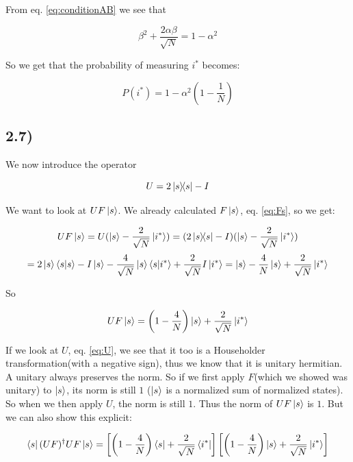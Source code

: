 \documentclass[a4paper,norsk, 10pt]{article}
\begin{document}
From eq. \eqref{eq:conditionAB} we see that

\begin{equation}
\beta^2 + \frac{2\alpha \beta}{\sqrt{N}}  = 1 - \alpha^2
\end{equation}

So we get that the probability of measuring $i^*$ becomes:

\begin{equation}
P(i^*) = 1 - \alpha^2\left(1 - \frac{1}{N}\right)
\label{eq:prob}
\end{equation}

\subsection{2.7)}

We now introduce the operator

\begin{equation}
U = 2\ketbra{s}{s} - I
\label{eq:U}
\end{equation}

We want to look at $UF\ket{s}$. We already calculated $F\ket{s}$, eq. \eqref{eq:Fs}, so we get: 

\begin{equation*}
UF\ket{s} = U(\ket{s} - \frac{2}{\sqrt{N}}\ket{i^*}) = (2\ketbra{s}{s} - I)(\ket{s} - \frac{2}{\sqrt{N}}\ket{i^*})
\end{equation*}
\begin{equation}
= 2\ket{s}\braket{s}{s} - I\ket{s} - \frac{4}{\sqrt{N}}\ket{s}\braket{s}{i^*} + \frac{2}{\sqrt{N}}I\ket{i^*} = \ket{s} - \frac{4}{N}\ket{s} + \frac{2}{\sqrt{N}}\ket{i^*} 
\end{equation}

So

\begin{equation}
UF\ket{s} =  \left(1 - \frac{4}{N}\right)\ket{s} + \frac{2}{\sqrt{N}}\ket{i^*} 
\label{eq:UFs}
\end{equation}


If we look at $U$, eq. \eqref{eq:U}, we see that it too is a Householder transformation(with a negative sign), thus we know that it is unitary hermitian. A unitary always preserves the norm. So if we first apply $F$(which we showed was unitary) to $\ket{s}$, its norm is still $1$ ($\ket{s}$ is a normalized sum of normalized states). So when we then apply $U$, the norm is still $1$. Thus the norm of $UF\ket{s}$ is $1$. But we can also show this explicit:

\begin{equation}
\bra{s}(UF)^\dagger UF\ket{s}=
\left[\left(1 - \frac{4}{N}\right)\bra{s} + \frac{2}{\sqrt{N}}\bra{i^*}\right]\left[\left(1 - \frac{4}{N}\right)\ket{s} + \frac{2}{\sqrt{N}}\ket{i^*}\right]
\end{equation}
\end{document}
